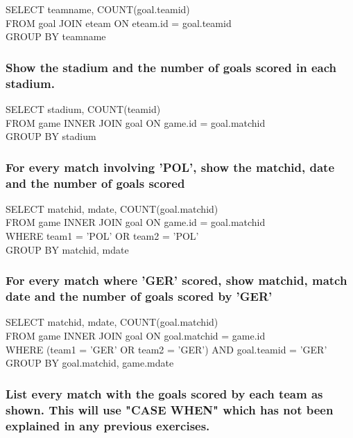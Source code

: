 \documentclass[10pt, oneside]{article}
\begin{document}
SELECT teamname, COUNT(goal.teamid)\\
FROM goal JOIN eteam ON eteam.id = goal.teamid\\
GROUP BY teamname\\

\subsubsection{Show the stadium and the number of goals scored in each stadium.}

SELECT stadium, COUNT(teamid)\\
FROM game INNER JOIN goal ON game.id = goal.matchid\\
GROUP BY stadium\\

\subsubsection{For every match involving 'POL', show the matchid, date and the number of goals scored}

SELECT matchid, mdate, COUNT(goal.matchid)\\
FROM game INNER JOIN goal ON game.id = goal.matchid\\
WHERE team1 = 'POL' OR team2 = 'POL'\\
GROUP BY matchid, mdate\\

\subsubsection{For every match where 'GER' scored, show matchid, match date and the number of goals scored by 'GER'}

SELECT matchid, mdate, COUNT(goal.matchid)\\
FROM game INNER JOIN goal ON goal.matchid = game.id\\
WHERE (team1 = 'GER' OR team2 = 'GER') AND goal.teamid = 'GER'\\
GROUP BY goal.matchid, game.mdate \\

\subsubsection{List every match with the goals scored by each team as shown. This will use "CASE WHEN" which has not been explained in any previous exercises.}
\end{document}
